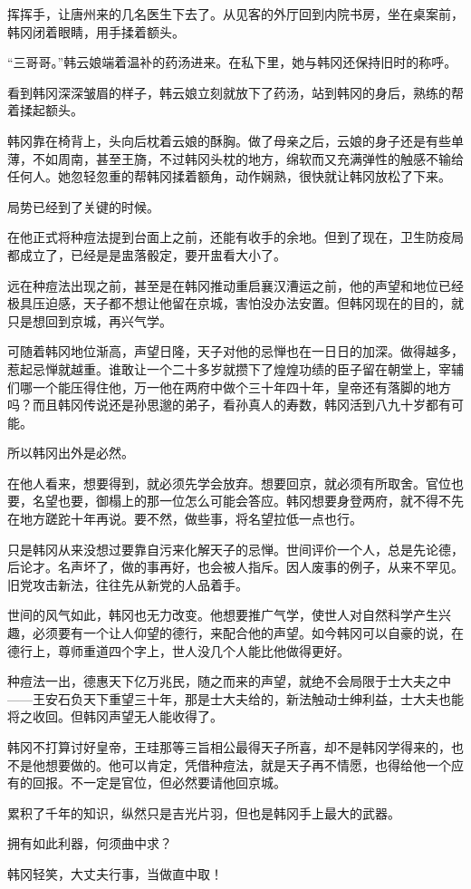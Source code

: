 挥挥手，让唐州来的几名医生下去了。从见客的外厅回到内院书房，坐在桌案前，韩冈闭着眼睛，用手揉着额头。

“三哥哥。”韩云娘端着温补的药汤进来。在私下里，她与韩冈还保持旧时的称呼。

看到韩冈深深皱眉的样子，韩云娘立刻就放下了药汤，站到韩冈的身后，熟练的帮着揉起额头。

韩冈靠在椅背上，头向后枕着云娘的酥胸。做了母亲之后，云娘的身子还是有些单薄，不如周南，甚至王旖，不过韩冈头枕的地方，绵软而又充满弹性的触感不输给任何人。她忽轻忽重的帮韩冈揉着额角，动作娴熟，很快就让韩冈放松了下来。

局势已经到了关键的时候。

在他正式将种痘法提到台面上之前，还能有收手的余地。但到了现在，卫生防疫局都成立了，已经是是盅落骰定，要开盅看大小了。

远在种痘法出现之前，甚至是在韩冈推动重启襄汉漕运之前，他的声望和地位已经极具压迫感，天子都不想让他留在京城，害怕没办法安置。但韩冈现在的目的，就只是想回到京城，再兴气学。

可随着韩冈地位渐高，声望日隆，天子对他的忌惮也在一日日的加深。做得越多，惹起忌惮就越重。谁敢让一个二十多岁就攒下了煌煌功绩的臣子留在朝堂上，宰辅们哪一个能压得住他，万一他在两府中做个三十年四十年，皇帝还有落脚的地方吗？而且韩冈传说还是孙思邈的弟子，看孙真人的寿数，韩冈活到八九十岁都有可能。

所以韩冈出外是必然。

在他人看来，想要得到，就必须先学会放弃。想要回京，就必须有所取舍。官位也要，名望也要，御榻上的那一位怎么可能会答应。韩冈想要身登两府，就不得不先在地方蹉跎十年再说。要不然，做些事，将名望拉低一点也行。

只是韩冈从来没想过要靠自污来化解天子的忌惮。世间评价一个人，总是先论德，后论才。名声坏了，做的事再好，也会被人指斥。因人废事的例子，从来不罕见。旧党攻击新法，往往先从新党的人品着手。

世间的风气如此，韩冈也无力改变。他想要推广气学，使世人对自然科学产生兴趣，必须要有一个让人仰望的德行，来配合他的声望。如今韩冈可以自豪的说，在德行上，尊师重道四个字上，世人没几个人能比他做得更好。

种痘法一出，德惠天下亿万兆民，随之而来的声望，就绝不会局限于士大夫之中——王安石负天下重望三十年，那是士大夫给的，新法触动士绅利益，士大夫也能将之收回。但韩冈声望无人能收得了。

韩冈不打算讨好皇帝，王珪那等三旨相公最得天子所喜，却不是韩冈学得来的，也不是他想要做的。他可以肯定，凭借种痘法，就是天子再不情愿，也得给他一个应有的回报。不一定是官位，但必然要请他回京城。

累积了千年的知识，纵然只是吉光片羽，但也是韩冈手上最大的武器。

拥有如此利器，何须曲中求？

韩冈轻笑，大丈夫行事，当做直中取！

